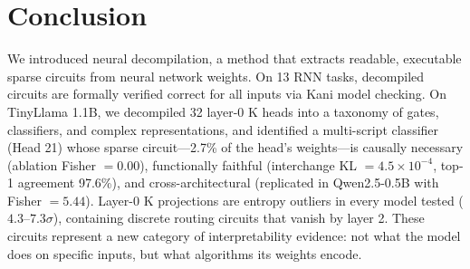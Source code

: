 \documentclass[11pt]{article}
\begin{document}
\section{Conclusion}

We introduced neural decompilation, a method that extracts readable, executable sparse circuits from neural network weights. On 13 RNN tasks, decompiled circuits are formally verified correct for all inputs via Kani model checking. On TinyLlama 1.1B, we decompiled 32 layer-0 K heads into a taxonomy of gates, classifiers, and complex representations, and identified a multi-script classifier (Head 21) whose sparse circuit---2.7\% of the head's weights---is causally necessary (ablation Fisher $= 0.00$), functionally faithful (interchange KL $= 4.5 \times 10^{-4}$, top-1 agreement 97.6\%), and cross-architectural (replicated in Qwen2.5-0.5B with Fisher $= 5.44$). Layer-0 K projections are entropy outliers in every model tested ($4.3$--$7.3\sigma$), containing discrete routing circuits that vanish by layer 2. These circuits represent a new category of interpretability evidence: not what the model does on specific inputs, but what algorithms its weights encode.
\end{document}
